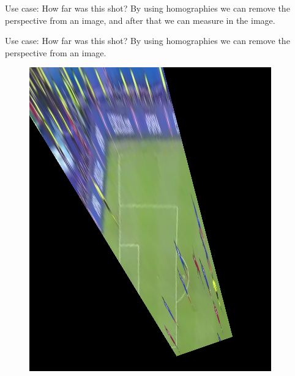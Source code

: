 \begin{frame}{\secname}{Use case: How far was this shot?}
    By using homographies we can remove the perspective from an image, and after that we can measure in the image.
    \begin{figure}
    \end{figure}
\end{frame}

\begin{frame}{\secname}{Use case: How far was this shot?}
    By using homographies we can remove the perspective from an image. 
    \begin{figure}
        \includegraphics[width=0.5\textheight]{img/homog_eden}
    \end{figure}
\end{frame}

